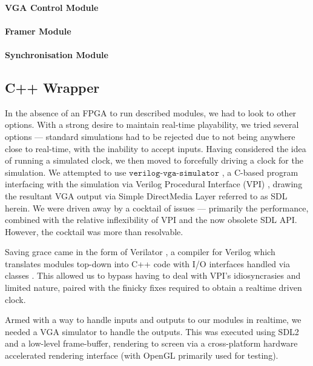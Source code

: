 \paragraph{VGA Control Module}
\paragraph{Framer Module}
\paragraph{Synchronisation Module}


\subsection{C++ Wrapper}

In the absence of an FPGA to run described modules, 
we had to look to other options. With a strong desire to 
maintain real-time playability, we tried several options ---
standard simulations had to be rejected due to not being 
anywhere close to real-time, with the inability to accept inputs.
Having considered the idea of running a simulated clock, we then
moved to forcefully driving a clock for the simulation. We attempted
to use \(\texttt{verilog-vga-simulator}\) \cite{vga-simulator},
a C-based program interfacing with the simulation via 
Verilog Procedural Interface (VPI) \cite{vpi}, drawing the resultant
VGA output via Simple DirectMedia Layer \cite{sdl} referred to as 
SDL herein. We were driven away by a cocktail of issues --- primarily
the performance, combined with the relative inflexibility of VPI 
and the now obsolete \cite{sdl_obsolete} SDL API. However, the cocktail
was more than resolvable.

Saving grace came in the form of Verilator \cite{verilator}, a compiler for
Verilog which translates modules top-down into C++ code with
I/O interfaces handled via classes \cite{verilator-implement}. This allowed
us to bypass having to deal with VPI's idiosyncrasies and limited nature, paired
with the finicky fixes required to obtain a realtime driven clock.

Armed with a way to handle inputs and outputs to our modules in realtime, we 
needed a VGA simulator to handle the outputs. This was executed using
SDL2 \cite{sdl2} and a low-level frame-buffer, rendering to screen via 
a cross-platform hardware accelerated rendering interface (with OpenGL \cite{opengl}
primarily used for testing).

